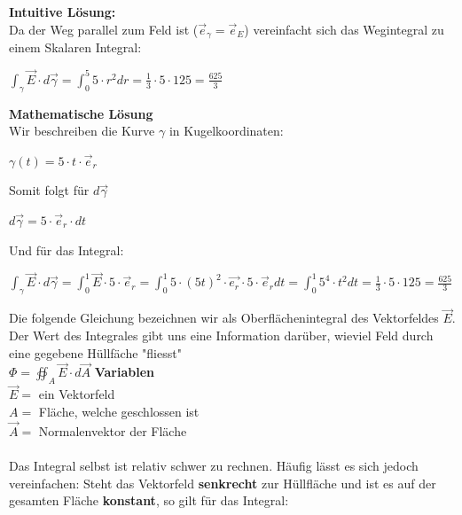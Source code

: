 \iend


\vspace \vfill
{}
\beginbsp
\textbf{Intuitive Lösung:} \\
Da der Weg parallel zum Feld ist ($\vec{e}_\gamma = \vec{e}_E$) vereinfacht sich das Wegintegral zu einem Skalaren Integral:
\begin{center}
	$\displaystyle \int_\gamma \vec{E}\cdot d\vec{\gamma} = \int_0^5 5 \cdot r^2 dr = \frac{1}{3} \cdot 5 \cdot 125 = \frac{625}{3}$
\end{center}
\textbf{Mathematische Lösung} \\
Wir beschreiben die Kurve $\gamma$ in Kugelkoordinaten:
\begin{center}
	$\gamma(t) = 5 \cdot t \cdot \vec{e}_r$
\end{center}
Somit folgt für $d \vec{\gamma}$
\begin{center}
	$d \vec{\gamma} = 5\cdot \vec{e}_r \cdot dt$
\end{center}
Und für das Integral:
\begin{center}

	$\displaystyle \int_\gamma \vec{E}\cdot d\vec{\gamma} =\int_0^1 \vec{E} \cdot 5 \cdot \vec{e}_r =  \int_0^1 5 \cdot (5t)^2 \cdot \vec{e_r} \cdot 5 \cdot \vec{e}_r dt =  \int_0^1 5^4 \cdot t^2 dt = \frac{1}{3} \cdot 5 \cdot 125 = \frac{625}{3}$
\end{center}
\iend

\newpage

\begingl
Die folgende Gleichung bezeichnen wir als Oberflächenintegral des Vektorfeldes $\vec{E}$. \\
 Der Wert des Integrales gibt uns eine Information darüber, wieviel Feld durch eine gegebene Hüllfäche "fliesst" \\

\formulaBegin
$ \displaystyle \Phi = \oiint_A \vec{E} \cdot d\vec{A}$
\formulaEnd
\textbf{Variablen} \\
$\vec{E} =$ ein Vektorfeld\\
$A = $ Fläche, welche geschlossen ist\\
$\vec{A} =$ Normalenvektor der Fläche \\
\\

Das Integral selbst ist relativ schwer zu rechnen. Häufig lässt es sich jedoch vereinfachen:
Steht das Vektorfeld \textbf{senkrecht} zur Hüllfläche und ist es auf der gesamten Fläche \textbf{konstant}, so gilt für das Integral: \\

